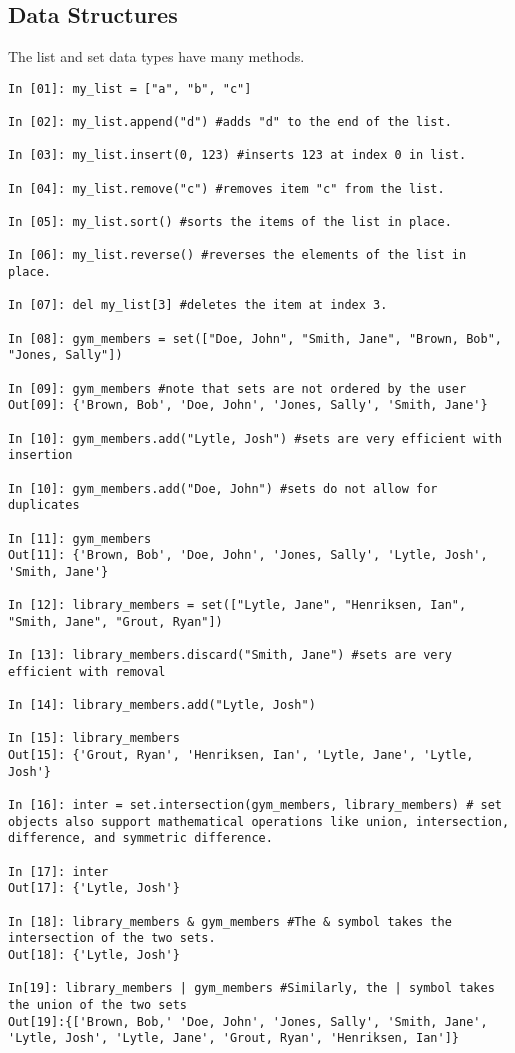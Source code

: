 \subsection*{Data Structures}
\begin{example}
The list and set data types have many methods. 
\begin{lstlisting}
In [01]: my_list = ["a", "b", "c"]

In [02]: my_list.append("d") #adds "d" to the end of the list.

In [03]: my_list.insert(0, 123) #inserts 123 at index 0 in list.

In [04]: my_list.remove("c") #removes item "c" from the list.

In [05]: my_list.sort() #sorts the items of the list in place.

In [06]: my_list.reverse() #reverses the elements of the list in place. 

In [07]: del my_list[3] #deletes the item at index 3.

In [08]: gym_members = set(["Doe, John", "Smith, Jane", "Brown, Bob", "Jones, Sally"])

In [09]: gym_members #note that sets are not ordered by the user
Out[09]: {'Brown, Bob', 'Doe, John', 'Jones, Sally', 'Smith, Jane'}

In [10]: gym_members.add("Lytle, Josh") #sets are very efficient with insertion

In [10]: gym_members.add("Doe, John") #sets do not allow for duplicates

In [11]: gym_members
Out[11]: {'Brown, Bob', 'Doe, John', 'Jones, Sally', 'Lytle, Josh', 'Smith, Jane'}

In [12]: library_members = set(["Lytle, Jane", "Henriksen, Ian", "Smith, Jane", "Grout, Ryan"])

In [13]: library_members.discard("Smith, Jane") #sets are very efficient with removal

In [14]: library_members.add("Lytle, Josh") 

In [15]: library_members
Out[15]: {'Grout, Ryan', 'Henriksen, Ian', 'Lytle, Jane', 'Lytle, Josh'}

In [16]: inter = set.intersection(gym_members, library_members) # set objects also support mathematical operations like union, intersection, difference, and symmetric difference.

In [17]: inter
Out[17]: {'Lytle, Josh'}

In [18]: library_members & gym_members #The & symbol takes the intersection of the two sets.
Out[18]: {'Lytle, Josh'}

In[19]: library_members | gym_members #Similarly, the | symbol takes the union of the two sets
Out[19]:{['Brown, Bob,' 'Doe, John', 'Jones, Sally', 'Smith, Jane', 'Lytle, Josh', 'Lytle, Jane', 'Grout, Ryan', 'Henriksen, Ian']}


\end{lstlisting}

\end{example}


